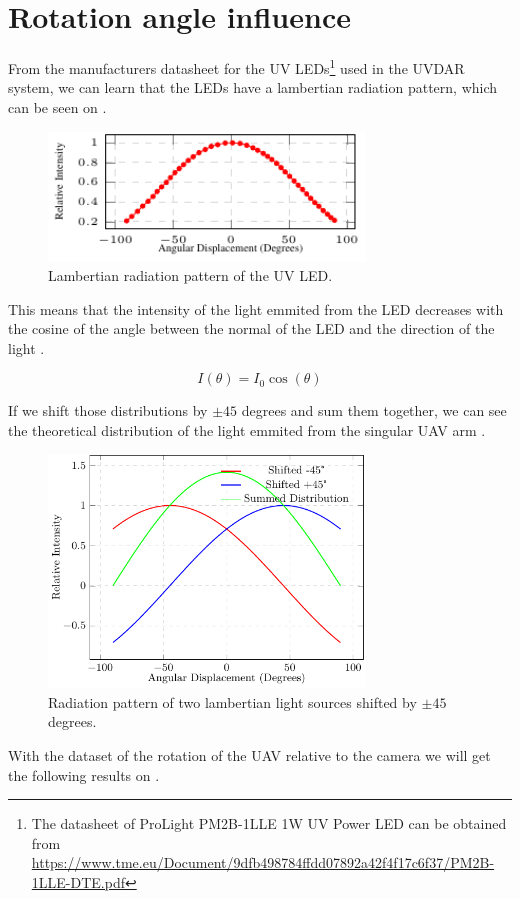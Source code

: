\newpage

\section{Rotation angle influence}

From the manufacturers datasheet for the UV LEDs\footnote{The datasheet of ProLight PM2B-1LLE 1W UV Power LED can be obtained from \url{https://www.tme.eu/Document/9dfb498784ffdd07892a42f4f17c6f37/PM2B-1LLE-DTE.pdf}}
used in the UVDAR system, we can learn that the LEDs have a lambertian radiation pattern,
which can be seen on .

\begin {figure}[htbp]
	\centering
	\includegraphics[width=0.75\textwidth]{./fig/plots/lambertian/lambertian.pdf}
	\caption{Lambertian radiation pattern of the UV LED.}
	\label{fig:lambertian}
\end{figure}

This means that the intensity of the light emmited from the LED decreases with the cosine
of the angle between the normal of the LED and the direction of the light .

\begin{equation}
	I(\theta) = I_0\cos(\theta)
	\label{eq:lambertian}
\end{equation}

If we shift those distributions by $\pm 45$ degrees and sum them together, we can see the
theoretical distribution of the light emmited from the singular UAV arm .
\begin {figure}[htbp]
	\centering
	\includegraphics[width=0.75\textwidth]{./fig/plots/lambertian/3lambertian.pdf}
	\caption{Radiation pattern of two lambertian light sources shifted by $\pm 45$ degrees.}
	\label{fig:lambert_combined}
\end{figure}
With the dataset of the rotation of the UAV relative to the camera we will get the following results
on .

